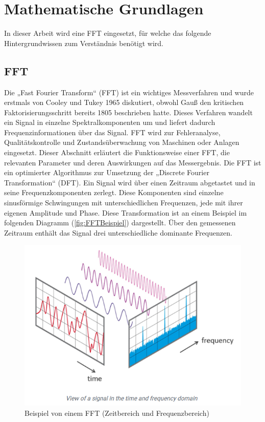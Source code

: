 \section{Mathematische Grundlagen}
In dieser Arbeit wird eine FFT eingesetzt, für welche das folgende Hintergrundwissen zum Verständnis benötigt wird.
\subsection{FFT}
\cite{NTIAudioFFT}\cite{WeissteinFFT}

Die „Fast Fourier Transform“ (FFT) ist ein wichtiges Messverfahren und wurde erstmals von Cooley und Tukey 1965 diskutiert, obwohl Gauß den kritischen Faktorisierungsschritt bereits 1805 beschrieben hatte. Dieses Verfahren wandelt ein Signal in einzelne Spektralkomponenten um und liefert dadurch Frequenzinformationen über das Signal. FFT wird zur Fehleranalyse, Qualitätskontrolle und Zustandsüberwachung von Maschinen oder Anlagen eingesetzt. Dieser Abschnitt erläutert die Funktionsweise einer FFT, die relevanten Parameter und deren Auswirkungen auf das Messergebnis.
Die FFT ist ein optimierter Algorithmus zur Umsetzung der „Discrete Fourier Transformation“ (DFT). Ein Signal wird über einen Zeitraum abgetastet und in seine Frequenzkomponenten zerlegt. Diese Komponenten sind einzelne sinusförmige Schwingungen mit unterschiedlichen Frequenzen, jede mit ihrer eigenen Amplitude und Phase. Diese Transformation ist an einem Beispiel im folgenden Diagramm (\autoref{fig:FFTBeispiel}) dargestellt. Über den gemessenen Zeitraum enthält das Signal drei unterschiedliche dominante Frequenzen.\\
\begin{figure}[H]
	\centering
	\includegraphics[width=0.5\linewidth]{Bilder/FFTBeispiel.png}
	\caption{Beispiel von einem FFT (Zeitbereich und Frequenzbereich)\cite{NTIAudioFFT}}
	\label{fig:FFTBeispiel}
\end{figure}

